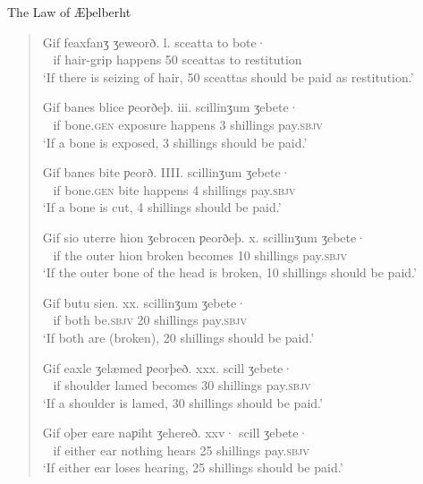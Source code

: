 \begin{texts}{The Law of Æþelberht}
\begin{quote}
     Gif feaxfanʒ ʒeweorð. l. sceatta to bote·\\
    ~ if hair-grip happens 50 sceattas to restitution\\\newline
    \trans `If there is seizing of hair, 50 sceattas should be paid as restitution.'
    
     Gif banes blice ƿeorðeþ. iii. scillinʒum ʒebete·\\
    ~ if bone.\textsc{gen} exposure happens 3 shillings pay.\textsc{sbjv}\\\newline
    \trans `If a bone is exposed, 3 shillings should be paid.'
    
     Gif banes bite ƿeorð. IIII. scillinʒum ʒebete·\\
    ~ if bone.\textsc{gen} bite happens 4 shillings pay.\textsc{sbjv}\\\newline
    \trans `If a bone is cut, 4 shillings should be paid.'
    
     Gif sio uterre hion ʒebrocen ƿeorðeþ. x. scillinʒum ʒebete·\\
    ~ if the outer hion broken becomes 10 shillings pay.\textsc{sbjv}\\\newline
    \trans `If the outer bone of the head is broken, 10 shillings should be paid.'
    
     Gif butu sien. xx. scillinʒum ʒebete·\\
    ~ if both be.\textsc{sbjv} 20 shillings pay.\textsc{sbjv}\\\newline
    \trans `If both are (broken), 20 shillings should be paid.'
    
     Gif eaxle ʒelæmed ƿeorþeð. xxx. scill ʒebete·\\
    ~ if shoulder lamed becomes 30 shillings pay.\textsc{sbjv}\\\newline
    \trans `If a shoulder is lamed, 30 shillings should be paid.'
    
     Gif oþer eare naƿiht ʒehereð. xxv· scill ʒebete·\\
    ~ if either ear nothing hears 25 shillings pay.\textsc{sbjv}\\\newline
    \trans `If either ear loses hearing, 25 shillings should be paid.'
    

\end{quote}
\end{texts}
